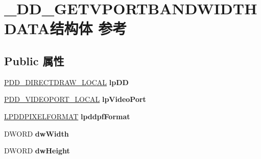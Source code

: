 \hypertarget{struct___d_d___g_e_t_v_p_o_r_t_b_a_n_d_w_i_d_t_h_d_a_t_a}{}\section{\+\_\+\+D\+D\+\_\+\+G\+E\+T\+V\+P\+O\+R\+T\+B\+A\+N\+D\+W\+I\+D\+T\+H\+D\+A\+T\+A结构体 参考}
\label{struct___d_d___g_e_t_v_p_o_r_t_b_a_n_d_w_i_d_t_h_d_a_t_a}
\subsection*{Public 属性}
\begin{DoxyCompactItemize}
\item 
\mbox{\label{struct___d_d___g_e_t_v_p_o_r_t_b_a_n_d_w_i_d_t_h_d_a_t_a_a8b5f300b5d9217f3a8ff8a74de6722b0}} 
\hyperlink{struct___d_d___d_i_r_e_c_t_d_r_a_w___l_o_c_a_l}{P\+D\+D\+\_\+\+D\+I\+R\+E\+C\+T\+D\+R\+A\+W\+\_\+\+L\+O\+C\+AL} {\bfseries lp\+DD}
\item 
\mbox{\label{struct___d_d___g_e_t_v_p_o_r_t_b_a_n_d_w_i_d_t_h_d_a_t_a_afd4440a003e758a49d32180c8410bf45}} 
\hyperlink{struct___d_d___v_i_d_e_o_p_o_r_t___l_o_c_a_l}{P\+D\+D\+\_\+\+V\+I\+D\+E\+O\+P\+O\+R\+T\+\_\+\+L\+O\+C\+AL} {\bfseries lp\+Video\+Port}
\item 
\mbox{\label{struct___d_d___g_e_t_v_p_o_r_t_b_a_n_d_w_i_d_t_h_d_a_t_a_a243b22f09514d87fd4de322b9f359fc6}} 
\hyperlink{interfacevoid}{L\+P\+D\+D\+P\+I\+X\+E\+L\+F\+O\+R\+M\+AT} {\bfseries lpddpf\+Format}
\item 
\mbox{\label{struct___d_d___g_e_t_v_p_o_r_t_b_a_n_d_w_i_d_t_h_d_a_t_a_ae50a850d9c115bf2aa73fc35e5c511e0}} 
D\+W\+O\+RD {\bfseries dw\+Width}
\item 
\mbox{\label{struct___d_d___g_e_t_v_p_o_r_t_b_a_n_d_w_i_d_t_h_d_a_t_a_ae89f9c26ccab1ee5dedb975ab679ebb2}} 
D\+W\+O\+RD {\bfseries dw\+Height}
\item 

\end{DoxyCompactItemize}
